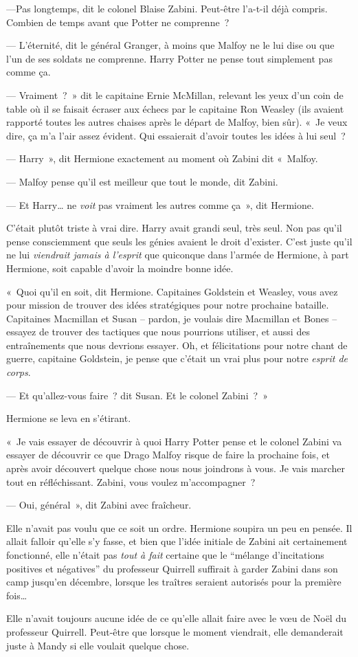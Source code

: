 ---Pas longtemps, dit le colonel Blaise Zabini.
Peut-être l'a-t-il déjà compris.
Combien de temps avant que Potter ne comprenne~?

--- L'éternité, dit le général Granger, à moins que Malfoy ne le lui dise ou que l'un de ses soldats ne comprenne.
Harry Potter ne pense tout simplement pas comme ça.

--- Vraiment~?~»
dit le capitaine Ernie McMillan, relevant les yeux d'un coin de table où il se faisait écraser aux échecs par le capitaine Ron Weasley (ils avaient rapporté toutes les autres chaises après le départ de Malfoy, bien sûr).
«~Je veux dire, ça m'a l'air assez évident.
Qui essaierait d'avoir toutes les idées à lui seul~?

--- Harry~», dit Hermione exactement au moment où Zabini dit «~Malfoy.

--- Malfoy pense qu'il est meilleur que tout le monde, dit Zabini.

--- Et Harry… ne \emph{voit} pas vraiment les autres comme ça~», dit Hermione.

C'était plutôt triste à vrai dire.
Harry avait grandi seul, très seul.
Non pas qu'il pense consciemment que seuls les génies avaient le droit d'exister.
C'est juste qu'il ne lui \emph{viendrait jamais à l'esprit} que quiconque dans l'armée de Hermione, à part Hermione, soit capable d'avoir la moindre bonne idée.

«~Quoi qu'il en soit, dit Hermione.
Capitaines Goldstein et Weasley, vous avez pour mission de trouver des idées stratégiques pour notre prochaine bataille.
Capitaines Macmillan et Susan -- pardon, je voulais dire Macmillan et Bones -- essayez de trouver des tactiques que nous pourrions utiliser, et aussi des entraînements que nous devrions essayer.
Oh, et félicitations pour notre chant de guerre, capitaine Goldstein, je pense que c'était un vrai plus pour notre \emph{esprit de corps}.

--- Et qu'allez-vous faire~? dit Susan.
Et le colonel Zabini~?~»

Hermione se leva en s'étirant.

«~Je vais essayer de découvrir à quoi Harry Potter pense et le colonel Zabini va essayer de découvrir ce que Drago Malfoy risque de faire la prochaine fois, et après avoir découvert quelque chose nous nous joindrons à vous.
Je vais marcher tout en réfléchissant.
Zabini, vous voulez m'accompagner~?

--- Oui, général~», dit Zabini avec fraîcheur.

Elle n'avait pas voulu que ce soit un ordre.
Hermione soupira un peu en pensée.
Il allait falloir qu'elle s'y fasse, et bien que l'idée initiale de Zabini ait certainement fonctionné, elle n'était pas \emph{tout à fait} certaine que le “mélange d'incitations positives et négatives” du professeur Quirrell suffirait à garder Zabini dans son camp jusqu'en décembre, lorsque les traîtres seraient autorisés pour la première fois…

Elle n'avait toujours aucune idée de ce qu'elle allait faire avec le vœu de Noël du professeur Quirrell.
Peut-être que lorsque le moment viendrait, elle demanderait juste à Mandy si elle voulait quelque chose.~
